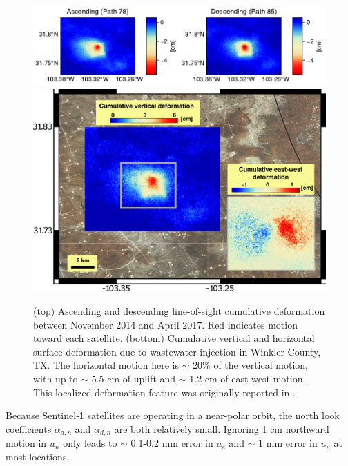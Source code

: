 \begin{figure}
	\centering
	\includegraphics[width=\textwidth]{figures/chapter2-sar/injection-asc-desc.pdf}
	\includegraphics[width=\textwidth]{figures/chapter2-sar/injection-kim-lu}
	\caption[Vertical and horizontal deformation near Winkler County, TX]{
		(top) Ascending and descending line-of-sight cumulative deformation between November 2014 and April 2017. Red indicates motion toward each satellite.
		(bottom) Cumulative vertical and horizontal surface deformation due to wastewater injection in Winkler County, TX. The horizontal motion here is $\sim$ 20\% of the vertical motion, with up to $\sim$ 5.5 cm of uplift and $\sim$ 1.2 cm of east-west motion. This localized deformation feature was originally reported in \cite{Kim2018AssociationLocalizedGeohazards}.}
	\label{fig:ch2-injection-kim-lu}
\end{figure}



Because Sentinel-1 satellites are operating in a near-polar orbit, the north look coefficients $\alpha_{a,n}$ and $\alpha_{d,n}$ are both relatively small. Ignoring 1 cm northward motion in $u_n$ only leads to $\sim$ 0.1-0.2 mm error in $u_e$ and $\sim$ 1 mm error in $u_u$ at most locations. 

